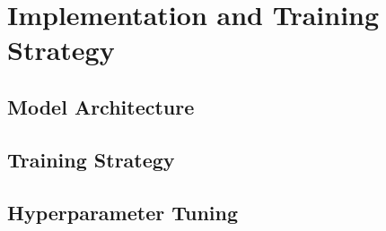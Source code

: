 \chapter{Implementation and Training Strategy} \label{chap:ImplementationAndTrainingStrategy}
\vspace{1cm}


\section{Model Architecture}

\section{Training Strategy}

\section{Hyperparameter Tuning}
